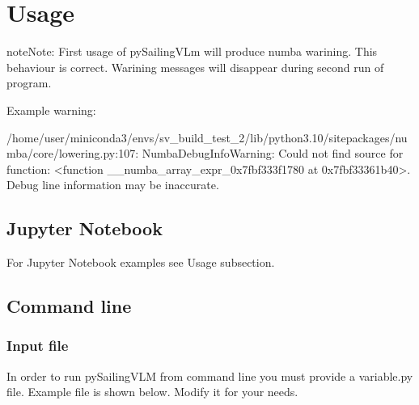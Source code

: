 \documentclass[letterpaper,10pt,english]{jupyterBook}
\begin{document}
\chapter{Usage}
\label{\detokenize{chapters/usage/usage:usage}}\label{\detokenize{chapters/usage/usage::doc}}
\begin{sphinxadmonition}{note}{Note:}
\sphinxAtStartPar
First usage of pySailingVLm will produce numba warining. This behaviour is correct. Warining messages will disappear during second run of program.

\sphinxAtStartPar
Example warning:

\sphinxAtStartPar
/home/user/miniconda3/envs/sv\_build\_test\_2/lib/python3.10/site\sphinxhyphen{}packages/numba/core/lowering.py:107: NumbaDebugInfoWarning: Could not find source for function: <function \_\_numba\_array\_expr\_0x7fbf333f1780 at 0x7fbf33361b40>. Debug line information may be inaccurate.
\end{sphinxadmonition}


\section{Jupyter Notebook}
\label{\detokenize{chapters/usage/usage:jupyter-notebook}}
\sphinxAtStartPar
For Jupyter Notebook examples see Usage subsection.


\section{Command line}
\label{\detokenize{chapters/usage/usage:command-line}}

\subsection{Input file}
\label{\detokenize{chapters/usage/usage:input-file}}
\sphinxAtStartPar
In order to run pySailingVLM from command line you must provide a variable.py file. Example file is shown below. Modify it for your needs.
\end{document}

